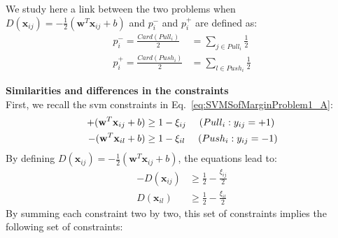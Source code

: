 \noindent We study here a link between the two problems when $D(\textbf{x}_{ij})=-\frac{1}{2}(\textbf{w}^T\textbf{x}_{ij}+b)$ and $p_i^-$ and $p_i^+$ are defined as:
\begin{align}
p_i^- = \frac{Card(Pull_i)}{2} & = \sum_{j \in Pull_i} \frac{1}{2} \label{eq:pi_plus_A}\\
p_i^+ = \frac{Card(Push_i)}{2} & = \sum_{l \in Push_i} \frac{1}{2} \label{eq:pi_moins_A}
\end{align}

 
\noindent \textbf{Similarities and differences in the constraints}\\
\noindent First, we recall the {\sc svm} constraints in Eq.~\ref{eq:SVMSofMarginProblem1_A}:
\begin{equation*}
	\begin{aligned}
		+(\textbf{w}^T\textbf{x}_{ij}+b) & \geq 1-\xi_{ij} \text{ \quad ($Pull_i: y_{ij}=+1$)} \\
		-(\textbf{w}^T\textbf{x}_{il}+b) & \geq 1-\xi_{il} \text{ \quad  ($Push_i: y_{ij}=-1$)}
	\end{aligned}
\end{equation*}
\noindent By defining $D(\textbf{x}_{ij})=-\frac{1}{2}(\textbf{w}^T\textbf{x}_{ij}+b)$, the equations lead to:
\begin{equation*}
	\begin{aligned}
		-D(\textbf{x}_{ij}) & \geq \frac{1}{2}-\frac{\xi_{ij}}{2} \\
		D(\textbf{x}_{il}) & \geq \frac{1}{2}-\frac{\xi_{il}}{2}
	\end{aligned}
\end{equation*}  
\noindent By summing each constraint two by two, this set of constraints implies the following set of constraints: \\
 \\

